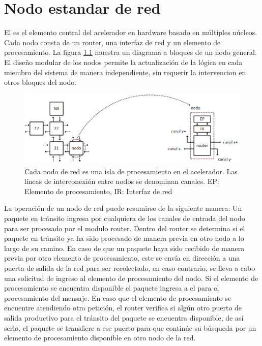 \chapter{Nodo estandar de red}
	\label{chap:nodo_de_red}

El  es el elemento central del acelerador en hardware basado en múltiples núcleos. Cada nodo consta de un router, una interfaz de red y un elemento de procesamiento. La figura \ref{fig:ch4_nodo} muestra un diagrama a bloques de un nodo general. El diseño modular de los nodos permite la actualización de la lógica en cada miembro del sistema de manera independiente, sin requerir la intervencion en otros bloques del nodo.

\begin{figure}
	\includegraphics[width=\linewidth]{figures/ch4_nodo.png}
	\caption
		{	
			Cada nodo de red es una isla de procesamiento en el acelerador. Las líneas de interconexión entre nodos se denominan canales. EP: Elemento de procesamiento, IR: Interfaz de red
		}
	\label{fig:ch4_nodo}
\end{figure}

La operación de un nodo de red puede resumirse de la siguiente manera: Un paquete en tránsito ingresa por cualquiera de los canales de entrada del nodo para ser procesado por el modulo router. Dentro del router se determina si el paquete en tránsito ya ha sido procesado de manera previa en otro nodo a lo largo de su camino. En caso de que un paquete haya sido recibido de manera previa por otro elemento de procesamiento, este se envía en dirección a una puerta de salida de la red para ser recolectado, en caso contrario, se lleva a cabo una solicitud de ingreso al elemento de procesamiento del nodo. Si el elemento de procesamiento se encuentra disponible el paquete ingresa a el para el procesamiento del mensaje. En caso que el elemento de procesamiento se encuentre atendiendo otra petición, el router verifica si algún otro puerto de salida productivo para el tránsito del paquete se encuentra disponible, de así serlo, el paquete se transfiere a ese puerto para que continúe su búsqueda por un elemento de procesamiento disponible en otro nodo de la red.

